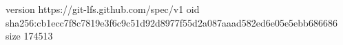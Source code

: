 version https://git-lfs.github.com/spec/v1
oid sha256:cb1ecc7f8c7819e3f6c9c51d92d8977f55d2a087aaad582ed6e05e5ebb686686
size 174513
